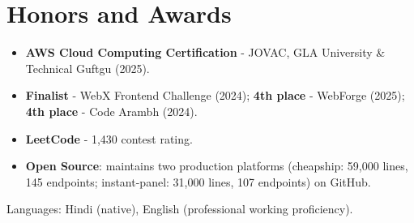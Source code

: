 \documentclass[11pt,a4paper,sans]{moderncv}
\begin{document}

\section{Honors and Awards}
\vspace{1pt}
\begin{itemize}
    \item {\textbf{AWS Cloud Computing Certification} - JOVAC, GLA University \& Technical Guftgu (2025).}
    \item {\textbf{Finalist} - WebX Frontend Challenge (2024); \textbf{4th place} - WebForge (2025); \textbf{4th place} - Code Arambh (2024).}
    \item {\textbf{LeetCode} - 1,430 contest rating.}
    \item {\textbf{Open Source}: maintains two production platforms (cheapship: 59,000 lines, 145 endpoints; instant-panel: 31,000 lines, 107 endpoints) on GitHub.}
\end{itemize}


\vspace{1pt}
\small{Languages: Hindi (native), English (professional working proficiency).}
\end{document}
